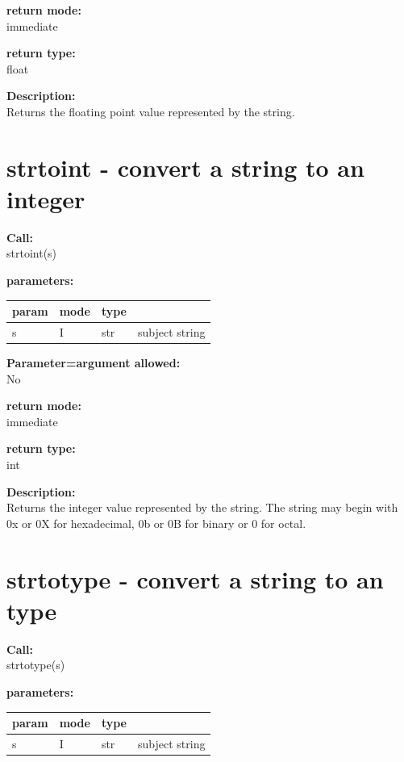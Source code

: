         {\bf return mode:} \\
        immediate

        {\bf return type:} \\
        float
        
        {\bf Description:} \\
        Returns the floating point value represented by the string.


    \section{strtoint - convert a string to an integer}\label{sec:ifstoi}
        
        {\bf Call:} \\
        strtoint(s)
        
        {\bf parameters:} \\
        \begin{tabular}{| l | l | l | l |}
        \hline
        param  & mode & type & \\
        \hline \hline
        s & I & str & subject string   \\ \hline
        \end{tabular}
        
        {\bf Parameter=argument allowed:} \\
        No
        
        {\bf return mode:} \\
        immediate

        {\bf return type:} \\
        int
        
        {\bf Description:} \\
        Returns the integer value represented by the string. The string
        may begin with 0x or 0X for hexadecimal, 0b or 0B for binary
        or 0 for octal.




    \section{strtotype - convert a string to an type}\label{sec:ifstot}
        
        {\bf Call:} \\
        strtotype(s)
        
        {\bf parameters:} \\
        \begin{tabular}{| l | l | l | l |}
        \hline
        param  & mode & type & \\
        \hline \hline
        s & I & str & subject string   \\ \hline
        \end{tabular}
        
